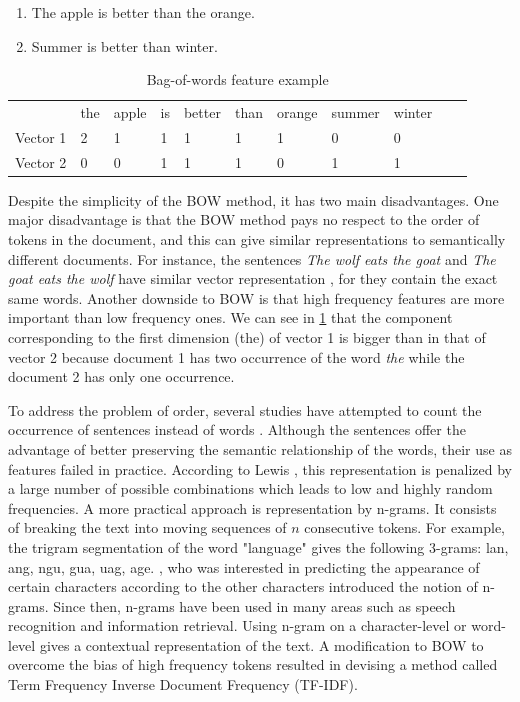 \begin{enumerate}
\item The apple is better than the orange.
\item Summer is better than winter. 
\end{enumerate}




\begin{table}
\centering
\caption {Bag-of-words feature example}
\begin{tabular}{l|l|l|l|l|l|l|l|l|l|l}
 & the & apple & is & better & than & orange & summer & winter \\
Vector 1 & 2 & 1 & 1 & 1 & 1 & 1 & 0 & 0 \\
Vector 2 & 0 & 0 & 1 & 1 & 1 & 0 & 1 & 1 \\
\end{tabular}
\label {tb:bow}
\end{table}


Despite the simplicity of the BOW method,  it has two main disadvantages. One major disadvantage is that the BOW method pays no respect to the order of tokens in the document, and this can give similar representations to semantically different documents. For instance, the sentences \emph{The wolf eats the goat} and \emph{The goat eats the wolf} have similar vector representation , for they contain the exact same words. Another downside to BOW is that high frequency features are more important than low frequency ones. We can see in \ref{tb:bow} that the component corresponding to the first dimension (the) of vector 1 is bigger than in that of vector 2 because document 1 has two occurrence of the word \emph{the} while the document 2 has only one occurrence. 

To address the problem of order, several studies have attempted to count the occurrence of sentences instead of words \citep{fuhr1991probabilistic, tzeras1993automatic}. Although the sentences offer the advantage of better preserving the semantic relationship of the words, their use as features failed in practice. According to Lewis \citeyear{lewis1992representation}, this representation is penalized by a large number of possible combinations which leads to low and highly
random frequencies. A more practical approach is representation by n-grams. It consists of breaking the text into moving sequences of $n$ consecutive tokens. For example, the trigram segmentation of the word "language" gives the following 3-grams: lan, ang, ngu, gua, uag, age. \citep{shannon1948mathematical}, who was interested in predicting the appearance of certain characters according to the other characters introduced the notion of n-grams. Since then, n-grams have been used in many areas such as speech recognition and information retrieval. Using n-gram on a character-level or word-level gives a contextual representation of the text. A modification to BOW to overcome the bias of high frequency tokens resulted in devising a method called Term Frequency Inverse Document Frequency (TF-IDF). 

